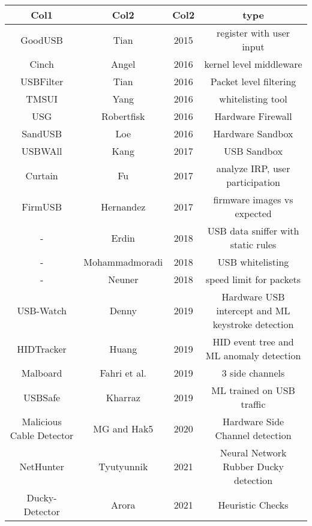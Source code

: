 \begin{center}
\begin{tabular}{|c c c c|} 
 \hline
 Col1 & Col2 & Col2 & type \\ [0.5ex] 
 \hline\hline
 GoodUSB & Tian \cite{tianDefendingMaliciousUSB2015} & 2015 & register with user input \\
 \hline
 Cinch & Angel \cite{angelDefendingMaliciousPeripherals2016} & 2016 & kernel level middleware \\
 \hline
 USBFilter & Tian \cite{tianMakingUSBGreat2016} & 2016 & Packet level filtering \\
 \hline
 TMSUI & Yang \cite{yangTMSUITrustManagement2016} & 2016 & whitelisting tool \\
 \hline
 USG & Robertfisk \cite{robertfiskRobertfiskUSG2016}  & 2016 & Hardware Firewall\\
 \hline
 SandUSB \cite{loeSandUSBInstallationfreeSandbox2016} & Loe & 2016 & Hardware Sandbox \\
 \hline
 USBWAll & Kang \cite{kangUSBWallNovelSecurity2017} & 2017 & USB Sandbox \\
 \hline
 Curtain &  Fu \cite{fuCurtainKeepYour2017} & 2017 & analyze IRP, user participation\\
 \hline
 FirmUSB & Hernandez \cite{hernandezFirmUSBVettingUSB2017} & 2017 & firmware images vs expected\\
 \hline
 - & Erdin \cite{erdinOSIndependentHardwareAssisted2018} & 2018 & USB data sniffer with static rules \\
 \hline
 -  & Mohammadmoradi \cite{mohammadmoradiMakingWhitelistingBasedDefense2018}  & 2018 & USB whitelisting\\
 \hline
 - & Neuner \cite{neunerUSBlockBlockingUSBBased2018} & 2018 & speed limit for packets \\
 \hline
 USB-Watch & Denny \cite{denneyUSBWatchDynamicHardwareAssisted2019} & 2019 & Hardware USB intercept and ML keystroke detection \\
 \hline
 HIDTracker & Huang \cite{IdentifyingHIDbasedAttacks2019} & 2019 & HID event tree and ML anomaly detection \\
 \hline
 Malboard & Fahri et al. \cite{farhiMalboardNovelUser2019} & 2019 & 3 side channels \\
 \hline
 USBSafe & Kharraz \cite{kharrazUSBESAFEEndPointSolution2019} & 2019 & ML trained on USB traffic\\
 \hline
 Malicious Cable Detector & MG and Hak5 \cite{hak5MaliciousCableDetector} & 2020 & Hardware Side Channel detection \\
 \hline
 NetHunter & Tyutyunnik \cite{IntelligentSystemPreventing} & 2021 & Neural Network Rubber Ducky detection \\
 \hline
 Ducky-Detector & Arora \cite{USBRubberDucky2021} & 2021 & Heuristic Checks \\
 \hline
 
\end{tabular}
\end{center}

